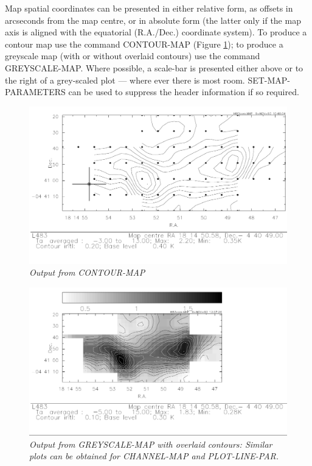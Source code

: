 \documentclass[11pt,twoside]{report}
\begin{document}
Map spatial coordinates can be presented in either relative form, as offsets
in arcseconds from the map centre, or in absolute form (the latter only if
the map axis is aligned with the equatorial (R.A./Dec.) coordinate system).
To produce a contour map use the command CONTOUR-MAP (Figure \ref{CONTOUR}); to
produce a greyscale map (with or without overlaid contours) use the command
GREYSCALE-MAP. Where possible, a scale-bar is
presented either above or to the right of a grey-scaled plot --- where ever
there is most room. SET-MAP-PARAMETERS can be used to suppress the header
information if so required.

\begin{figure}[htbp]
\begin{center}
\includegraphics[scale=0.65]{contour}
\protect\parbox{5.5in}
{\caption[CONTOUR]
{\sl
Output from CONTOUR-MAP
\label{CONTOUR}
}
}
\end{center}
\end{figure}

\begin{figure}[htbp]
\begin{center}
\includegraphics[scale=0.75]{greyscale}
\protect\parbox{5.5in}
{\caption[GREYSCALE]
{\sl
Output from GREYSCALE-MAP with overlaid contours: Similar plots can be
obtained for CHANNEL-MAP and PLOT-LINE-PAR.
\label{GREYSCALE}
}
}
\end{center}
\end{figure}
\end{document}
